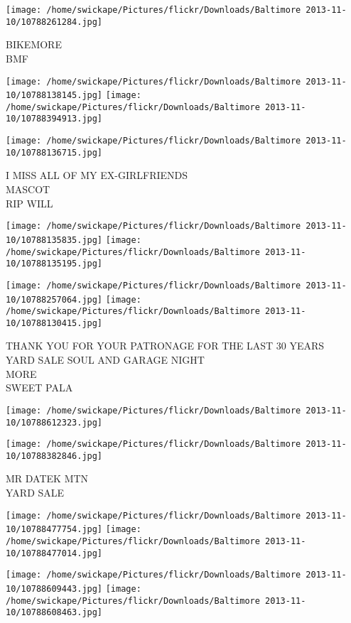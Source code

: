 \documentclass[10pt,letterpaper]{article}
\begin{document}
\vspace{0.25in}
\texttt{[image: /home/swickape/Pictures/flickr/Downloads/Baltimore 2013-11-10/10788261284.jpg]}

BIKEMORE\\
BMF
\pagebreak

\texttt{[image: /home/swickape/Pictures/flickr/Downloads/Baltimore 2013-11-10/10788138145.jpg]}
\texttt{[image: /home/swickape/Pictures/flickr/Downloads/Baltimore 2013-11-10/10788394913.jpg]}

\vspace{0.25in}
\texttt{[image: /home/swickape/Pictures/flickr/Downloads/Baltimore 2013-11-10/10788136715.jpg]}

I MISS ALL OF MY EX{-}GIRLFRIENDS\\
MASCOT\\
RIP WILL
\pagebreak

\texttt{[image: /home/swickape/Pictures/flickr/Downloads/Baltimore 2013-11-10/10788135835.jpg]}
\texttt{[image: /home/swickape/Pictures/flickr/Downloads/Baltimore 2013-11-10/10788135195.jpg]}

\texttt{[image: /home/swickape/Pictures/flickr/Downloads/Baltimore 2013-11-10/10788257064.jpg]}
\texttt{[image: /home/swickape/Pictures/flickr/Downloads/Baltimore 2013-11-10/10788130415.jpg]}

THANK YOU FOR YOUR PATRONAGE FOR THE LAST 30 YEARS\\
YARD SALE SOUL AND GARAGE NIGHT\\
MORE\\
SWEET PALA
\pagebreak

\texttt{[image: /home/swickape/Pictures/flickr/Downloads/Baltimore 2013-11-10/10788612323.jpg]}

\vspace{0.25in}
\texttt{[image: /home/swickape/Pictures/flickr/Downloads/Baltimore 2013-11-10/10788382846.jpg]}

MR DATEK MTN\\
YARD SALE
\pagebreak

\texttt{[image: /home/swickape/Pictures/flickr/Downloads/Baltimore 2013-11-10/10788477754.jpg]}
\texttt{[image: /home/swickape/Pictures/flickr/Downloads/Baltimore 2013-11-10/10788477014.jpg]}

\texttt{[image: /home/swickape/Pictures/flickr/Downloads/Baltimore 2013-11-10/10788609443.jpg]}
\texttt{[image: /home/swickape/Pictures/flickr/Downloads/Baltimore 2013-11-10/10788608463.jpg]}
\end{document}
